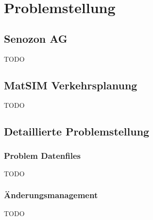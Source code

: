 \chapter{Problemstellung}

\section{Senozon AG}
\begin{flushleft}
TODO
\end{flushleft}
\section{MatSIM Verkehrsplanung}
\begin{flushleft}
TODO
\end{flushleft}
\section{Detaillierte Problemstellung}
\subsection{Problem Datenfiles}
\begin{flushleft}
TODO
\end{flushleft}
\subsection{Änderungsmanagement}
\begin{flushleft}
TODO
\end{flushleft}



